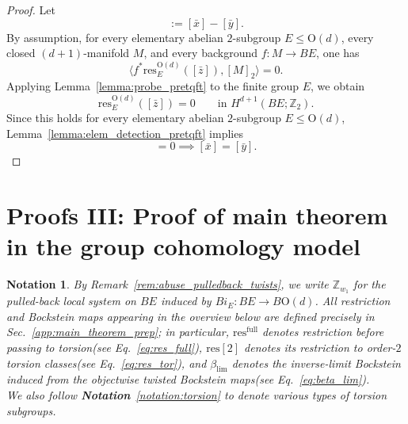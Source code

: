 \documentclass[aps,prx,reprint,superscriptaddress,twocolumn,amsmath,amssymb,amsfonts, nofootinbib]{revtex4-2}
\newcommand{\res}{\text{res}}
\newcommand{\Z}{\mathbb{Z}}
\theoremstyle{apsstyle}
\newtheorem{notation}{Notation}
\begin{document}
\begin{proof}
Let
\begin{equation*}
[\bar z]:=[\bar x]-[\bar y].
\end{equation*}
By assumption, for every elementary abelian $2$-subgroup $E\leq \mathrm{O}(d)$,
every closed $(d+1)$-manifold $M$, and every background $f:M\to BE$, one has
\begin{equation*}
\big\langle f^*\res^{\mathrm{O}(d)}_{E}([\bar z]),[M]_2\big\rangle=0.
\end{equation*}
Applying Lemma~\ref{lemma:probe_pretqft} to the finite group $E$, we obtain
\begin{equation*}
\res^{\mathrm{O}(d)}_{E}([\bar z])=0
\qquad
\text{in }H^{d+1}(BE;\mathbb Z_2).
\end{equation*}
Since this holds for every elementary abelian $2$-subgroup $E\leq \mathrm{O}(d)$,
Lemma~\ref{lemma:elem_detection_pretqft} implies
\begin{equation*}
[\bar z]=0 \implies 
[\bar x]=[\bar y].
\end{equation*}
\end{proof}

\section{Proofs III: Proof of main theorem in the group cohomology model}
\label{app:lift}

\begin{notation}
By Remark~\ref{rem:abuse_pulledback_twists}, we write $\Z_{w_1}$ for the pulled-back local system on $BE$ induced by $Bi_E:BE\to B\mathrm{O}(d)$. All restriction and Bockstein maps appearing in the overview below are defined precisely in Sec.~\ref{app:main_theorem_prep}; in particular, $\res^{\mathrm{full}}$ denotes restriction before passing to torsion(see Eq.~\ref{eq:res_full}), $\res[2]$ denotes its restriction to order-$2$ torsion classes(see Eq.~\ref{eq:res_tor}), and $\beta_{\lim}$ denotes the inverse-limit Bockstein induced from the objectwise twisted Bockstein maps(see Eq.~\ref{eq:beta_lim}). \\
\noindent We also follow {\bf Notation}~\ref{notation:torsion} to denote various types of torsion subgroups.
\end{notation}



\bigskip 
\end{document}
